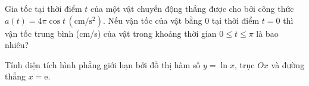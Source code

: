 \begin{bt}%

	Gia tốc tại thời điểm $t$ của một vật chuyển động thẳng được cho bởi công thức $a(t)=4\pi\cos t\,\left(\mathrm{cm/s^2}\right)$. Nếu vận tốc của vật bằng $0$ tại thời điểm $t=0$ thì vận tốc trung bình (cm/s) của vật trong khoảng thời gian $0\leq t\leq \pi$ là bao nhiêu?
\end{bt}

\begin{bt}%
	Tính diện tích hình phẳng giới hạn bởi đồ thị hàm số $y=\ln x$, trục $Ox$ và đường thẳng $x=\mathrm{e}$.
\end{bt}

